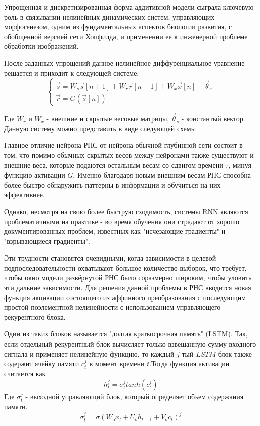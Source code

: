 \documentclass[12pt, a4paper]{article} %
\begin{document}
Упрощенная и дискретизированная форма аддитивной модели сыграла ключевую роль в связывании нелинейных динамических систем, управляющих морфогенезом, одним из фундаментальных аспектов биологии развития, с обобщенной версией сети Хопфилда, и применении ее к инженерной проблеме обработки изображений.

После заданных упрощений \cite{Sherstinsky} данное нелинейное диффуренциальное уравнение решается и приходит к следующей системе:
\begin{equation}
    \begin{cases}
        \vec{s}= W_s\vec{s}[n+1] + W_r\vec{r}[n-1] + W_x\vec{x}[n] + \vec{\theta}_s\\
        \vec{r}= G(\vec{s}[n])
    \end{cases}
\end{equation}

Где $W_r$ и $W_x$ - внешние и скрытые весовые матрицы, $\vec{\theta}_s$ - константый вектор.
\newpage
Данную систему можно представить в виде следующей схемы


Главное отличие нейрона РНС от нейрона обычной глубинной сети состоит в том, что помимо обычных скрытых весов между нейронами также существуют и внешние веса, которые подаются остальным весам со сдвигом времени $\tau$, минуя функцию активации $G$. Именно благодаря новым внешним весам РНС способна более быстро обнаружить паттерны в информации и обучиться на них эффективнее.

Однако, несмотря на свою более быструю сходимость, системы RNN являются проблематичными на практике - во время обучения они страдают от хорошо документированных проблем, известных как "исчезающие градиенты" и "взрывающиеся градиенты".

Эти трудности становятся очевидными, когда зависимости в целевой подпоследовательности охватывают большое количество выборок, что требует, чтобы окно модели развёрнутой РНС было соразмерно широким, чтобы уловить эти дальние зависимости.
Для решения данной проблемы в РНС вводится новая функция акцивации состоящего из аффинного преобразования с последующим простой поэлементной нелинейности с использованием управляющего рекурентного блока\cite{Junyoung}.

Один из таких блоков называется "долгая краткосрочная память" (LSTM). Так, если отдельный рекурентный блок вычисляет только взвешанную сумму входного сигнала и применяет нелинейную функцию, то каждый $j$-тый $LSTM$ блок также содержит ячейку памяти $c_t^j$ в момент времени $t$.Тогда функция активации считается как 
\begin{equation}
    h_t^j = \sigma_t^j tanh(c_t^j)
\end{equation}
Где $\sigma_t^j$ - выходной управляющий блок, который определяет объем содержания памяти.
\begin{equation}
    \sigma^j_t = \sigma(W_o x_t + U_o h_{t-1} + V_o c_t)^j
\end{equation}
\end{document}

